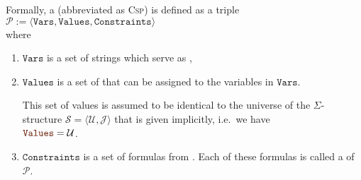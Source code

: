 \begin{Definition}[CSP]  \hspace*{\fill} \linebreak
Formally, a   (abbreviated as
\textsc{Csp}) is defined as a triple 
\\[0.2cm]
\hspace*{1.3cm}
$\mathcal{P} := \langle \mathtt{Vars}, \mathtt{Values}, \mathtt{Constraints} \rangle$
\\[0.2cm]
where
\begin{enumerate}
\item $\mathtt{Vars}$ is a set of strings which serve as ,
\item $\mathtt{Values}$ is a set of  that can be assigned to the variables in $\mathtt{Vars}$.

      This set of values is assumed to be identical to the universe of the $\Sigma$-structure
      $\mathcal{S} = \langle \mathcal{U}, \mathcal{J} \rangle$ that is given implicitly, i.e.~we have
      \\[0.2cm]
      \hspace*{1.3cm}
      $\mytt{Values} = \mathcal{U}$.
\item $\mathtt{Constraints}$ is a set of formulas from .  Each of these formulas is
      called a  of $\mathcal{P}$.  \eox
\end{enumerate}
\end{Definition}
\vspace*{-0.3cm}

